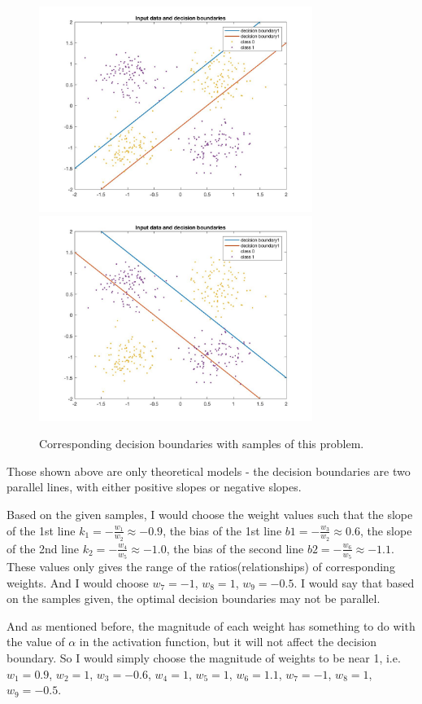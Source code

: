 \documentclass[a4paper]{article}
\begin{document}
\begin{spacing}{2.0}
\begin{itemize}
\begin{figure}[H]
\centering
\includegraphics[width = 3.5in]{positiveplot.jpg}
\includegraphics[width = 3.5in]{negativeplot.jpg}
\caption{Corresponding decision boundaries with samples of this problem.}
\label{modelsplot}
\end{figure}

Those shown above are only theoretical models - the decision boundaries are two parallel lines, with either positive slopes or negative slopes.

 Based on the given samples, I would choose the weight values such that the slope of the 1st line $k_1 = -\displaystyle\frac{w_1}{w_2} \approx -0.9$, the bias of the 1st line $b1 = -\displaystyle\frac{w_3}{w_2} \approx 0.6$, the slope of the 2nd line $k_2 = -\displaystyle\frac{w_4}{w_5} \approx -1.0$, the bias of the second line $b2 = -\displaystyle\frac{w_6}{w_5} \approx -1.1$. These values only gives the range of the ratios(relationships) of corresponding weights. And I would choose $w_7 = -1$, $w_8 = 1$, $w_9 = -0.5$. I would say that based on the samples given, the optimal decision boundaries may not be parallel. 

And as mentioned before, the magnitude of each weight has something to do with the value of $\alpha$ in the activation function, but it will not affect the decision boundary. So I would simply choose the magnitude of weights to be near 1, i.e. $w_1 = 0.9$, $w_2 = 1$, $w_3 = -0.6$, $w_4 = 1$, $w_5 = 1$, $w_6 = 1.1$, $w_7 = -1$, $w_8 = 1$, $w_9 = -0.5$.


\end{itemize}
\end{spacing}
\end{document}
